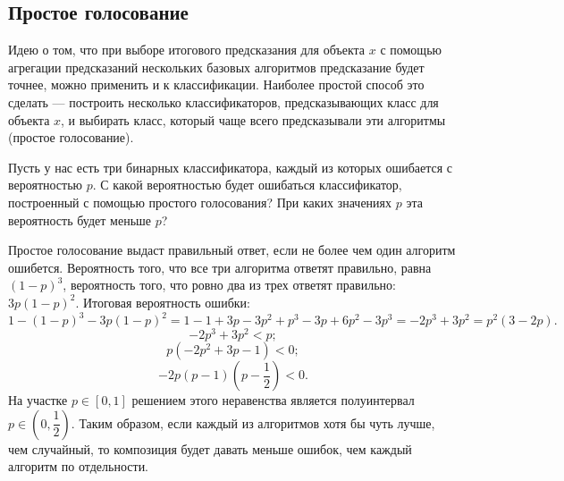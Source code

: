 \documentclass[12pt,fleqn]{article}
\begin{document}
    \subsection{Простое голосование}
    Идею о том, что при выборе итогового предсказания для объекта $x$ с помощью агрегации предсказаний нескольких базовых алгоритмов предсказание будет точнее, можно применить и к классификации.
    Наиболее простой способ это сделать --- построить несколько классификаторов, предсказывающих класс для объекта $x$, и выбирать класс, который чаще всего предсказывали эти алгоритмы (простое голосование).
    \begin{vkProblem}
        Пусть у нас есть три бинарных классификатора, каждый из которых ошибается с вероятностью $p$.
        С какой вероятностью будет ошибаться классификатор, построенный с помощью простого голосования?
        При каких значениях $p$ эта вероятность будет меньше $p$?
    \end{vkProblem}    
    \begin{esSolution}
        Простое голосование выдаст правильный ответ, если не более чем один алгоритм ошибется.
        Вероятность того, что все три алгоритма ответят правильно, равна $(1-p)^3$, вероятность того, что ровно два из трех ответят правильно: $3p(1-p)^2$.
        Итоговая вероятность ошибки:
        $$
        1 - (1-p)^3 - 3p(1-p)^2
        =
        1 - 1 + 3p - 3p^2 + p^3 - 3p + 6 p^2 - 3 p^3
        =
        - 2 p^3+ 3  p^2
        =
        p^2 (3 - 2p).
        $$
        $$
        - 2 p^3+ 3  p^2 < p;
        $$
        $$
        p(- 2 p^2+ 3 p - 1) < 0;
        $$
        $$
        -2 p (p-1) (p - \dfrac 1 2) < 0.
        $$
        На участке $p \in \left[0, 1\right]$ решением этого неравенства является полуинтервал $p \in (0, \dfrac{1}{2})$.
        Таким образом, если каждый из алгоритмов хотя бы чуть лучше, чем случайный, то композиция будет давать меньше ошибок, чем каждый алгоритм по отдельности.
    \end{esSolution}
    
\end{document}
